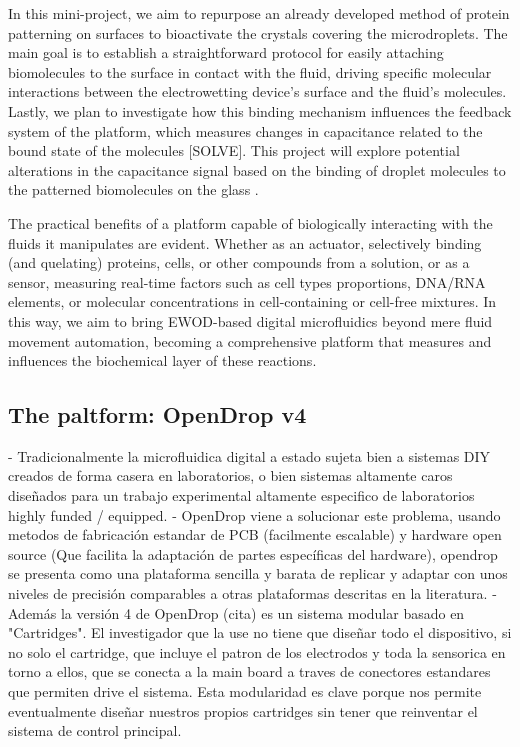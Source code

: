 \documentclass[12pt]{article}
\begin{document}
In this mini-project, we aim to repurpose an already developed method of protein patterning on surfaces to bioactivate the crystals covering the microdroplets\cite{straleMultiproteinPrintingLightInduced2016}. The main goal is to establish a straightforward protocol for easily attaching biomolecules to the surface in contact with the fluid, driving specific molecular interactions between the electrowetting device's surface and the fluid's molecules. Lastly, we plan to investigate how this binding mechanism influences the feedback system of the platform, which measures changes in capacitance related to the bound state of the molecules [SOLVE]. This project will explore potential alterations in the capacitance signal based on the binding of droplet molecules to the patterned biomolecules on the glass \cite{wangUltraSensitiveCapacitiveMicrowire2019}.

The practical benefits of a platform capable of biologically interacting with the fluids it manipulates are evident. Whether as an actuator, selectively binding (and quelating) proteins, cells, or other compounds from a solution, or as a sensor, measuring real-time factors such as cell types proportions, DNA/RNA elements, or molecular concentrations in cell-containing or cell-free mixtures. In this way, we aim to bring EWOD-based digital microfluidics beyond mere fluid movement automation, becoming a comprehensive platform that measures and influences the biochemical layer of these reactions.


\subsection*{The paltform: OpenDrop v4}
- Tradicionalmente la microfluidica digital a estado sujeta bien a sistemas DIY creados de forma casera en laboratorios, o bien sistemas altamente caros diseñados para un trabajo experimental altamente especifico de laboratorios highly funded / equipped. 
- OpenDrop viene a solucionar este problema, usando metodos de fabricación estandar de PCB (facilmente escalable) y hardware open source (Que facilita la adaptación de partes específicas del hardware), opendrop se presenta como una plataforma sencilla y barata de replicar y adaptar con unos niveles de precisión comparables a otras plataformas descritas en la literatura.
- Además la versión 4 de OpenDrop (cita) es un sistema modular basado en "Cartridges". El investigador que la use no tiene que diseñar todo el dispositivo, si no solo el cartridge, que incluye el patron de los electrodos y toda la sensorica en torno a ellos, que se conecta a la main board a traves de conectores estandares que permiten drive el sistema. Esta modularidad es clave porque nos permite eventualmente diseñar nuestros propios cartridges sin tener que reinventar el sistema de control principal.
\end{document}
